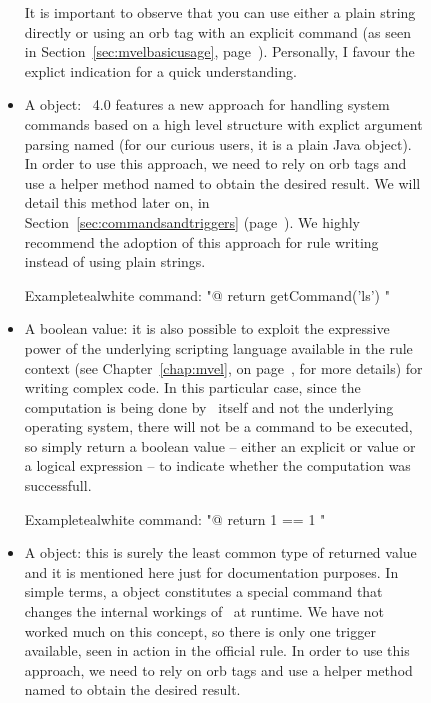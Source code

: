 \begin{description}
\begin{description}
\begin{itemize}[label={--}]
It is important to observe that you can use either a plain string directly or using an orb tag with an explicit  command (as seen in Section~\ref{sec:mvelbasicusage}, page~\pageref{sec:mvelbasicusage}). Personally, I favour the explict indication for a quick understanding.

\item A  object: \arara\ 4.0 features a new approach for handling system commands based on a high level structure with explict argument parsing named  (for our curious users, it is a plain Java object). In order to use this approach, we need to rely on orb tags and use a helper method named  to obtain the desired result. We will detail this method later on, in Section~\ref{sec:commandsandtriggers} (page~\pageref{sec:commandsandtriggers}). We highly recommend the adoption of this approach for rule writing instead of using plain strings.

\begin{codebox}{Example}{teal}{\icnote}{white}
command: "@{ return getCommand('ls') }"
\end{codebox}

\item A boolean value: it is also possible to exploit the expressive power of the underlying scripting language available in the rule context (see Chapter~\ref{chap:mvel}, on page~\pageref{chap:mvel}, for more details) for writing complex code. In this particular case, since the computation is being done by \arara\ itself and not the underlying operating system, there will not be a command to be executed, so simply return a boolean value -- either an explicit  or  value or a logical expression -- to indicate whether the computation was successfull.

\begin{codebox}{Example}{teal}{\icnote}{white}
command: "@{ return 1 == 1 }"
\end{codebox}

\item A  object: this is surely the least common type of returned value and it is mentioned here just for documentation purposes. In simple terms, a  object constitutes a special command that changes the internal workings of \arara\ at runtime. We have not worked much on this concept, so there is only one trigger available, seen in action in the official  rule. In order to use this approach, we need to rely on orb tags and use a helper method named  to obtain the desired result.
\end{itemize}


\end{description}
\end{description}
